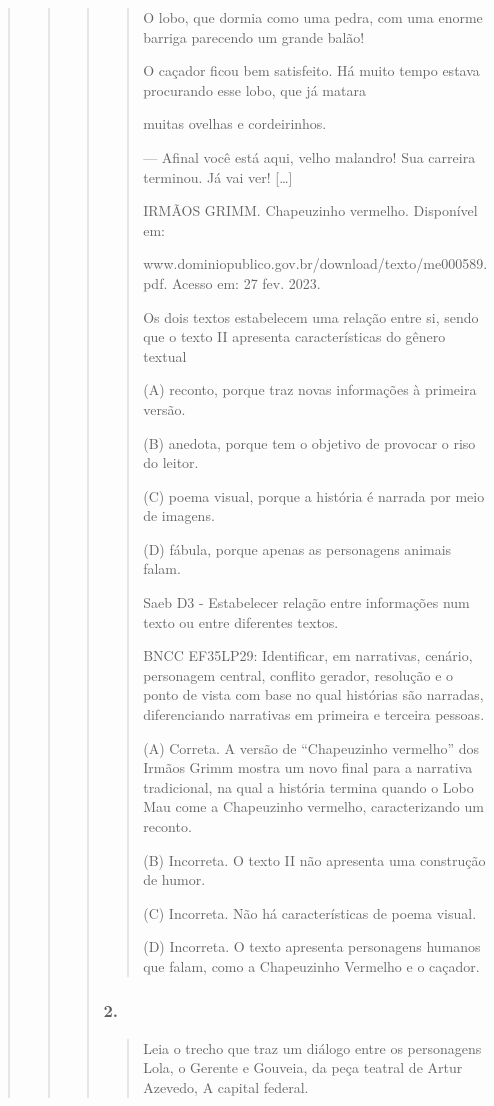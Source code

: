\begin{quote}
\begin{quote}
\begin{quote}
\begin{quote}
O lobo, que dormia como uma pedra, com uma enorme barriga parecendo um
grande balão!

O caçador ficou bem satisfeito. Há muito tempo estava procurando esse
lobo, que já matara

muitas ovelhas e cordeirinhos.

--- Afinal você está aqui, velho malandro! Sua carreira terminou. Já vai
ver! {[}\ldots{}{]}

IRMÃOS GRIMM. Chapeuzinho vermelho. Disponível em:

www.dominiopublico.gov.br/download/texto/me000589.pdf. Acesso em: 27
fev. 2023.

Os dois textos estabelecem uma relação entre si, sendo que o texto II
apresenta características do gênero textual

(A) reconto, porque traz novas informações à primeira versão.

(B) anedota, porque tem o objetivo de provocar o riso do leitor.

(C) poema visual, porque a história é narrada por meio de imagens.

(D) fábula, porque apenas as personagens animais falam.

Saeb D3 - Estabelecer relação entre informações num texto ou entre
diferentes textos.

BNCC EF35LP29: Identificar, em narrativas, cenário, personagem central,
conflito gerador, resolução e o ponto de vista com base no qual
histórias são narradas, diferenciando narrativas em primeira e terceira
pessoas.

(A) Correta. A versão de ``Chapeuzinho vermelho'' dos Irmãos Grimm
mostra um novo final para a narrativa tradicional, na qual a história
termina quando o Lobo Mau come a Chapeuzinho vermelho, caracterizando um
reconto.

(B) Incorreta. O texto II não apresenta uma construção de humor.

(C) Incorreta. Não há características de poema visual.

(D) Incorreta. O texto apresenta personagens humanos que falam, como a
Chapeuzinho Vermelho e o caçador.
\end{quote}

\subsubsection{2. }\label{section-85}

\begin{quote}
Leia o trecho que traz um diálogo entre os personagens Lola, o Gerente e
Gouveia, da peça teatral de Artur Azevedo, A capital federal.


\end{quote}
\end{quote}
\end{quote}
\end{quote}
